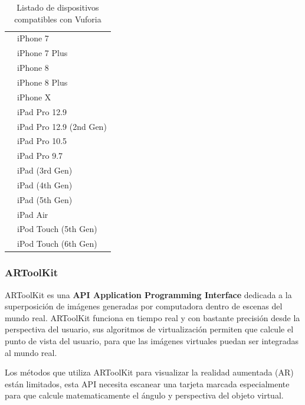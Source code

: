 \begin{itemize}
\begin{table}[]
\begin{tabular}{| p{4.5cm} | p{10.5cm} |}
			& iPhone 7   \\ \cline{2-2}
			& iPhone 7 Plus   \\ \cline{2-2}
			& iPhone 8    \\ \cline{2-2}
			& iPhone 8 Plus   \\ \cline{2-2}
			& iPhone X   \\ \cline{2-2}
			& iPad Pro 12.9   \\ \cline{2-2}
			& iPad Pro 12.9 (2nd Gen)   \\ \cline{2-2}
			& iPad Pro 10.5   \\ \cline{2-2}
			& iPad Pro 9.7   \\ \cline{2-2}
			& iPad (3rd Gen)   \\ \cline{2-2}
			& iPad (4th Gen)   \\ \cline{2-2}
			& iPad (5th Gen)  \\  \cline{2-2}
			& iPad Air   \\ \cline{2-2}
			& iPod Touch (5th Gen)   \\ \cline{2-2}
			& iPod Touch (6th Gen)   \\ \hline 
		\end{tabular}
		\captionsetup{justification=centering}
		\caption{Listado de dispositivos compatibles con Vuforia}
	\end{table}
		
\end{itemize}
\newpage
\noindent
\subsubsection{ARToolKit}
ARToolKit es una \textbf{API Application Programming Interface} dedicada a la superposición de imágenes generadas por computadora dentro de escenas del mundo real. ARToolKit funciona en tiempo real y con bastante precisión desde la perspectiva del usuario, sus algoritmos de virtualización permiten que calcule el punto de vista del usuario, para que las imágenes virtuales puedan ser integradas al mundo real.\cite{B07}\par
Los métodos que utiliza ARToolKit para visualizar la realidad aumentada (AR) están limitados, esta API necesita escanear una tarjeta marcada especialmente para que calcule matematicamente el ángulo y perspectiva del objeto virtual.\cite{B07}\par

